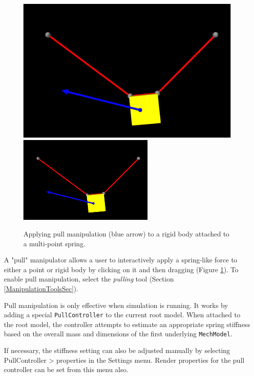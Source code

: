 \documentclass{article}
\begin{document}
\begin{figure}
\begin{center}
\iflatexml
\includegraphics[]{images/pullManipulation}
\else
\includegraphics[width=0.6\textwidth]{images/pullManipulation}
\fi
\end{center}
\caption{Applying pull manipulation (blue arrow) to a rigid body 
attached to a multi-point spring.}%
\label{PullManipulationFig}
\end{figure}

A "pull" manipulator allows a user to interactively apply a
spring-like force to either a point or rigid body by clicking on it
and then dragging (Figure \ref{PullManipulationFig}). To enable pull
manipulation, select the {\it pulling} tool (Section
\ref{ManipulationToolsSec}).

Pull manipulation is only effective when simulation is running.  It
works by adding a special {\tt PullController} to the current root
model. When attached to the root model, the controller attempts to
estimate an appropriate spring stiffness based on the overall mass and
dimensions of the first underlying {\tt MechModel}.

If necessary, the stiffness setting can also be adjusted manually by
selecting {\sf PullController > properties} in the {\sf Settings}
menu.  Render properties for the pull controller can be set from this
menu also.
\end{document}

